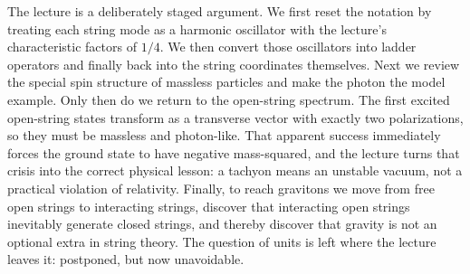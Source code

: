 The lecture is a deliberately staged argument. We first reset the notation by treating each string mode as a harmonic oscillator with the lecture's characteristic factors of \(1/4\). We then convert those oscillators into ladder operators and finally back into the string coordinates themselves. Next we review the special spin structure of massless particles and make the photon the model example. Only then do we return to the open-string spectrum. The first excited open-string states transform as a transverse vector with exactly two polarizations, so they must be massless and photon-like. That apparent success immediately forces the ground state to have negative mass-squared, and the lecture turns that crisis into the correct physical lesson: a tachyon means an unstable vacuum, not a practical violation of relativity. Finally, to reach gravitons we move from free open strings to interacting strings, discover that interacting open strings inevitably generate closed strings, and thereby discover that gravity is not an optional extra in string theory. The question of units is left where the lecture leaves it: postponed, but now unavoidable.
